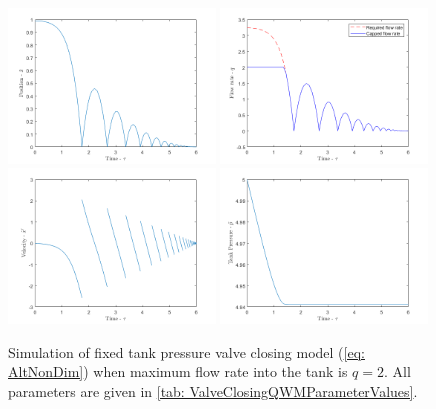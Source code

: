 % 
\begin{figure}[!ht]
    \centering
    \includegraphics[width=0.49\textwidth]{Figures/FixedPressure/Position.png}
    \includegraphics[width=0.49\textwidth]{Figures/FixedPressure/FlowRate.png}
    \includegraphics[width=0.49\textwidth]{Figures/FixedPressure/Velocity.png}
    \includegraphics[width=0.49\textwidth]{Figures/FixedPressure/Pressure.png}
    \caption{Simulation of fixed tank pressure valve closing model (\cref{eq: AltNonDim}) when maximum flow rate into the tank is $q = 2$. All parameters are given in \cref{tab: ValveClosingQWMParameterValues}.}
    \label{fig: FixPres}
\end{figure}

